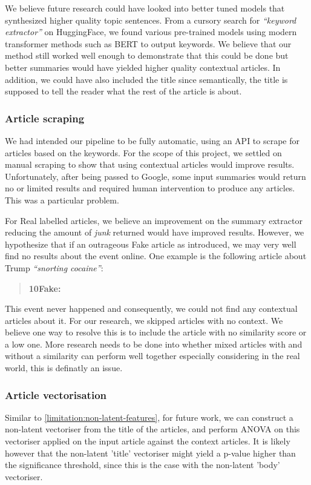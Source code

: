 \documentclass{article}
\begin{document}
We believe future research could have looked into better tuned models that synthesized higher quality topic sentences. From a cursory search for \emph{``keyword extractor''} on HuggingFace, we found various pre-trained models using modern transformer methods such as BERT to output keywords. We believe that our method still worked well enough to demonstrate that this could be done but better summaries would have yielded higher quality contextual articles. In addition, we could have also included the title since semantically, the title is supposed to tell the reader what the rest of the article is about.

\subsubsection*{Article scraping}\label{limitation:article-scraping}

We had intended our pipeline to be fully automatic, using an API to scrape for articles based on the keywords. For the scope of this project, we settled on manual scraping to show that using contextual articles would improve results. Unfortunately, after being passed to Google, some input summaries would return no or limited results and required human intervention to produce any articles. This was a particular problem.

For Real labelled articles, we believe an improvement on the summary extractor reducing the amount of \emph{junk} returned would have improved results. However, we hypothesize that if an outrageous Fake article as introduced, we may very well find no results about the event online. One example is the following article about Trump \emph{``snorting cocaine''}:
\begin{quote}
  \textbf{10Fake:}\quad{}
\end{quote}
This event never happened and consequently, we could not find any contextual articles about it. For our research, we skipped articles with no context. We believe one way to resolve this is to include the article with no similarity score or a low one. More research needs to be done into whether mixed articles with and without a similarity can perform well together especially considering in the real world, this is definatly an issue.

\subsubsection*{Article vectorisation}\label{limitation:article-vectorisation}
Similar to \ref{limitation:non-latent-features}, for future work, we can construct a non-latent vectoriser from the title of the articles, and perform ANOVA on this vectoriser applied on the input article against the context articles. It is likely however that the non-latent 'title' vectoriser might yield a p-value higher than the significance threshold, since this is the case with the non-latent 'body' vectoriser.
\end{document}
